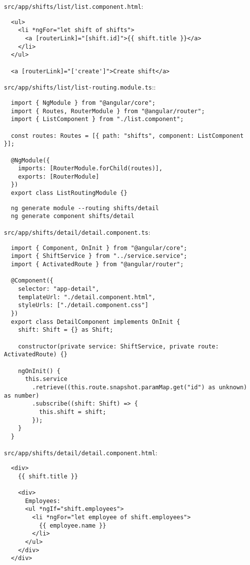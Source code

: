 \texttt{src/app/shifts/list/list.component.html}:
\begin{verbatim}
  <ul>
    <li *ngFor="let shift of shifts">
      <a [routerLink]="[shift.id]">{{ shift.title }}</a>
    </li>
  </ul>

  <a [routerLink]="['create']">Create shift</a>
\end{verbatim}

\texttt{src/app/shifts/list/list-routing.module.ts}::
\begin{verbatim}
  import { NgModule } from "@angular/core";
  import { Routes, RouterModule } from "@angular/router";
  import { ListComponent } from "./list.component";

  const routes: Routes = [{ path: "shifts", component: ListComponent }];

  @NgModule({
    imports: [RouterModule.forChild(routes)],
    exports: [RouterModule]
  })
  export class ListRoutingModule {}
\end{verbatim}

\begin{verbatim}
  ng generate module --routing shifts/detail
  ng generate component shifts/detail
\end{verbatim}

\texttt{src/app/shifts/detail/detail.component.ts}:
\begin{verbatim}
  import { Component, OnInit } from "@angular/core";
  import { ShiftService } from "../service.service";
  import { ActivatedRoute } from "@angular/router";

  @Component({
    selector: "app-detail",
    templateUrl: "./detail.component.html",
    styleUrls: ["./detail.component.css"]
  })
  export class DetailComponent implements OnInit {
    shift: Shift = {} as Shift;

    constructor(private service: ShiftService, private route: ActivatedRoute) {}

    ngOnInit() {
      this.service
        .retrieve((this.route.snapshot.paramMap.get("id") as unknown) as number)
        .subscribe((shift: Shift) => {
          this.shift = shift;
        });
    }
  }
\end{verbatim}

\texttt{src/app/shifts/detail/detail.component.html}:
\begin{verbatim}
  <div>
    {{ shift.title }}

    <div>
      Employees:
      <ul *ngIf="shift.employees">
        <li *ngFor="let employee of shift.employees">
          {{ employee.name }}
        </li>
      </ul>
    </div>
  </div>
\end{verbatim}

